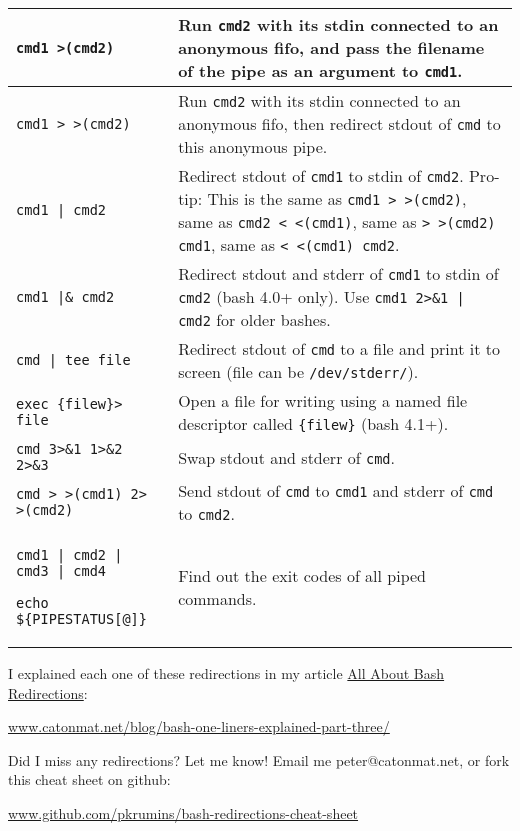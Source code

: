 \documentclass[9pt]{memoir}
\begin{document}
\begin{tabular}{|m{5.5cm}|m{12.2cm}|}
\hline
\verb/cmd1 >(cmd2)/ & Run \verb|cmd2| with its stdin connected to an anonymous fifo, and pass the filename of the pipe as an argument to \verb|cmd1|. \\
\hline
\verb/cmd1 > >(cmd2)/ & Run \verb|cmd2| with its stdin connected to an anonymous fifo, then redirect stdout of \verb|cmd| to this anonymous pipe. \\
\hline
\verb/cmd1 | cmd2/ & Redirect stdout of \verb|cmd1| to stdin of \verb|cmd2|. Pro-tip: This is the same as \verb|cmd1 > >(cmd2)|, same as \verb|cmd2 < <(cmd1)|, same as \verb|> >(cmd2) cmd1|, same as \verb|< <(cmd1) cmd2|. \\
\hline
\verb/cmd1 |& cmd2/ & Redirect stdout and stderr of \verb|cmd1| to stdin of \verb|cmd2| (bash 4.0+ only). Use \verb/cmd1 2>&1 | cmd2/ for older bashes. \\
\hline
\verb/cmd | tee file/ & Redirect stdout of \verb|cmd| to a file and print it to screen (file can be \verb|/dev/stderr/|). \\
\hline
\verb|exec {filew}> file| & Open a file for writing using a named file descriptor called \verb|{filew}| (bash 4.1+). \\
\hline
\verb|cmd 3>&1 1>&2 2>&3| & Swap stdout and stderr of \verb|cmd|. \\
\hline
\verb|cmd > >(cmd1) 2> >(cmd2)| & Send stdout of \verb|cmd| to \verb|cmd1| and stderr of \verb|cmd| to \verb|cmd2|. \\
\hline
\verb/cmd1 | cmd2 | cmd3 | cmd4/ \par
\verb/echo ${PIPESTATUS[@]}/ & Find out the exit codes of all piped commands. \\
\hline
\end{tabular}

\vfill

I explained each one of these redirections in my article \href{http://www.catonmat.net/blog/bash-one-liners-explained-part-three/}{All About Bash Redirections}: \par
\href{http://www.catonmat.net/blog/bash-one-liners-explained-part-three/}{www.catonmat.net/blog/bash-one-liners-explained-part-three/}

\vfill

Did I miss any redirections? Let me know! Email me peter@catonmat.net, or fork this cheat sheet on github: \par \href{http://github.com/pkrumins/bash-redirections-cheat-sheet}{www.github.com/pkrumins/bash-redirections-cheat-sheet}

\vfill

\end{document}
